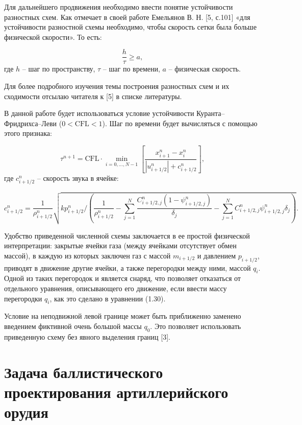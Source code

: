 \documentclass[14pt, a4paper]{extreport} %
\begin{document}
Для дальнейшего продвижения необходимо ввести понятие устойчивости разностных схем. Как отмечает в своей работе Емельянов В. Н. [5, с.101] «для устойчивости разностной схемы необходимо, чтобы скорость сетки была больше физической скорости». То есть:

\[
\frac{h}{\tau} \geq a,
\]
где \( h \) -- шаг по пространству, \( \tau \) -- шаг по времени, \( a \) -- физическая скорость.

Для более подробного изучения темы построения разностных схем и их сходимости отсылаю читателя к [5] в списке литературы.

В данной работе будет использоваться условие устойчивости Куранта--Фридрихса--Леви (\(0 < \text{CFL} < 1\)). Шаг по времени 
будет вычисляться с помощью этого признака:

\begin{equation}
\tau^{n+1} = \text{CFL} \cdot \min_{i=0,\ldots,N-1} \left[ \frac{x_{i+1}^n - x_i^n}{|u_{i+1/2}^n| + c_{i+1/2}^n} \right],
\end{equation}
где \(c_{i+1/2}^n\) -- скорость звука в ячейке:

\begin{equation}
c_{i+1/2}^n = \frac{1}{\rho_{i+1/2}^n} \sqrt{k p_{i+1/2}^n / \left( \frac{1}{\rho_{i+1/2}^n} - \sum_{j=1}^N \frac{C_{i+1/2,j}^n (1-\psi_{i+1/2,j}^n)}{\delta_j} - \sum_{j=1}^N C_{i+1/2,j}^n \psi_{i+1/2,j}^n \delta_j \right)}.
\end{equation}

Удобство приведенной численной схемы заключается в ее простой физической интерпретации: закрытые ячейки газа (между ячейками отсутствует обмен массой), в каждую из которых заключен газ с массой \( m_{i+1/2} \) и давлением \( p_{i+1/2} \), приводят в движение другие ячейки, а также перегородки между ними, массой \( q_i \). Одной из таких перегородок и является снаряд, что позволяет отказаться от отдельного уравнения, описывающего его движение, если ввести массу перегородки \( q_i \), как это сделано в уравнении (1.30). 

Условие на неподвижной левой границе может быть приближенно заменено введением фиктивной очень большой массы \( q_0 \). Это позволяет использовать приведенную схему без явного выделения границ [3].

\chapter{Задача баллистического проектирования артиллерийского орудия}
\end{document}
